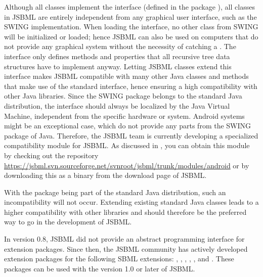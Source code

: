 \begin{description}
  Although all classes implement the \TreeNode interface (defined in
  the package ), all classes in JSBML are entirely
  independent from any graphical user interface, such as the
  SWING
  implementation. When loading the \TreeNode interface, no other
  class from SWING will be initialized or loaded; hence JSBML can also be
  used on computers that do not provide any graphical system without the
  necessity of catching a \HeadlessException. The \TreeNode
  interface only defines methods and properties that all recursive tree data
  structures have to implement anyway. Letting JSBML classes extend this
  interface makes JSBML compatible with many other Java classes and methods
  that make use of the standard \TreeNode interface, hence ensuring a
  high compatibility with other Java libraries. Since the SWING package
  belongs to the standard Java distribution, the
  \TreeNode interface should always be localized by the Java Virtual
  Machine, independent from the specific hardware or
  system. Android systems might be an exceptional case, which
  do not provide any parts from the SWING package of Java. Therefore, the
  JSBML team is currently developing a specialized 
  compatibility module for JSBML. As discussed in ,
  you can obtain this module by checking out the repository
  \url{https://jsbml.svn.sourceforge.net/svnroot/jsbml/trunk/modules/android} or by
  downloading this as a binary from the download page of JSBML.

\item[\parbox{\textwidth-5pt}{Does the usage of the \code{java.beans}
    package for the \code{TreeNodeChangeListener} lead to an
    incompatibility with light-weight Java installations?}]

  With the  package being part of the standard Java
  distribution, such an incompatibility will not occur. Extending existing
  standard Java classes leads to a higher compatibility with other
  libraries and should therefore be the preferred way to go in the
  development of JSBML.

\item[\parbox{\textwidth-5pt}{Does JSBML support SBML extension packages?}]

  In version 0.8, JSBML did not provide an abstract programming interface
  for extension packages.%
   Since then, the JSBML community has
  actively developed extension packages for the following SBML extensions:
  , , , ,
  , and . These packages can be used with the
  version 1.0 or later of JSBML.

\end{description}
